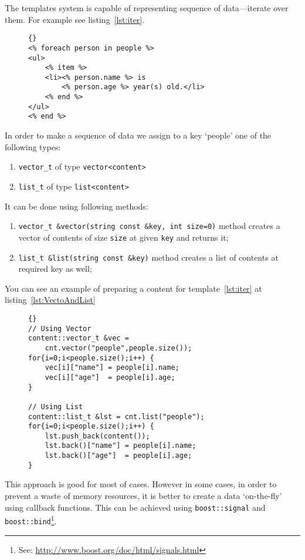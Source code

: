 \documentclass{article}
\newcommand{\tw}[1]{\texttt{#1}}
\begin{document}
The templates system is capable of representing sequence of data---iterate over them. For example see listing~\ref{lst:iter}.

\begin{figure}
\begin{lstlisting}[label=lst:iter,caption=Simple Iterating Over Sequences]{}
<% foreach person in people %>
<ul>
	<% item %>
	<li><% person.name %> is 
		<% person.age %> year(s) old.</li>
	<% end %> 
</ul>
<% end %>
\end{lstlisting}
\end{figure}

In order to make a sequence of data we assign to a key `people' one of the following types:
\begin{enumerate}
\item \verb+vector_t+ of type \verb+vector<content>+
\item \verb+list_t+ of type \verb+list<content>+
\end{enumerate}
It can be done using following methods:
\begin{enumerate}
\item \verb+vector_t &vector(string const &key, int size=0)+ 
 method creates a vector of contents of size \tw{size} at given \tw{key} and returns it;
\item \verb+list_t &list(string const &key)+ 
 method creates a list of contents at required key as well;
\end{enumerate}

You can see an example of preparing a content for template~\ref{lst:iter} at listing~\ref{lst:VectoAndList}
\begin{figure}
\begin{lstlisting}[label=lst:VectoAndList,caption=Creating a Sequence of Contents]{}
// Using Vector
content::vector_t &vec = 
	cnt.vector("people",people.size());
for{i=0;i<people.size();i++) {
	vec[i]["name"] = people[i].name;
	vec[i]["age"]  = people[i].age;
}

// Using List
content::list_t &lst = cnt.list("people");
for{i=0;i<people.size();i++) {
	lst.push_back(content());
	lst.back()["name"] = people[i].name;
	lst.back()["age"]  = people[i].age;
}\end{lstlisting}
\end{figure}

This approach is good for most of cases. However in some cases, in order to prevent 
a waste of memory resources, it is better to create
a data `on-the-fly' using callback functions. This can be achieved using
\tw{boost::signal} and \tw{boost::bind}\footnote{See: \url{http://www.boost.org/doc/html/signals.html}}.
\end{document}
